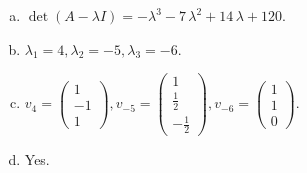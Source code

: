 \begin{questions}
\begin{solution}
\begin{enumerate}[(a)]
\item $\det(A-\lambda I)=-{\lambda}^{3} - 7 \, {\lambda}^{2} + 14 \, {\lambda} + 120$.
\item ${\lambda}_1=4, {\lambda}_2=-5, {\lambda}_3=-6$.
\item $v_{4}=\left(\begin{array}{r}
1 \\
-1 \\
1
\end{array}\right), v_{-5}=\left(\begin{array}{r}
1 \\
\frac{1}{2} \\
-\frac{1}{2}
\end{array}\right), v_{-6}=\left(\begin{array}{r}
1 \\
1 \\
0
\end{array}\right)$.
\item Yes.
\end{enumerate}
\end{solution}

\end{questions}

\newpage


\begin{center}
\end{center}

